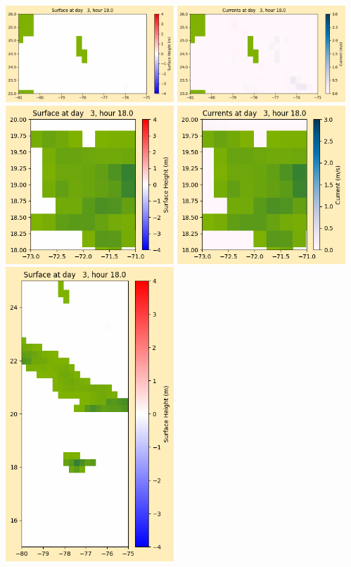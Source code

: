 \documentclass[11pt]{article}
\begin{document}
\vskip 10pt 
\includegraphics[width=0.475\textwidth]{frame0027fig1003.png}
\includegraphics[width=0.475\textwidth]{frame0027fig1004.png}
\vskip 10pt 
\includegraphics[width=0.475\textwidth]{frame0027fig1005.png}
\includegraphics[width=0.475\textwidth]{frame0027fig1006.png}
\vskip 10pt 
\includegraphics[width=0.475\textwidth]{frame0027fig1007.png}
\end{document}
